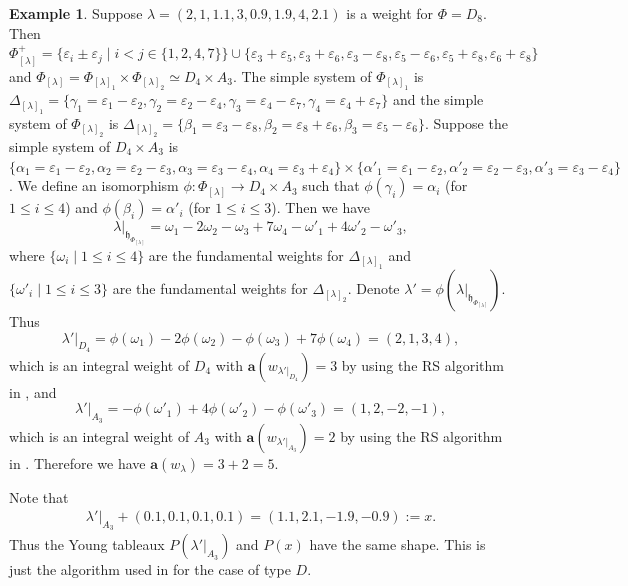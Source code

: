 \documentclass[reqno,12pt]{amsart}
\numberwithin{equation}{section}
\theoremstyle{plain}
\theoremstyle{definition}
\newtheorem{ex}[Thm]{Example}
\newcommand{\lam}{\lambda}
\newcommand{\ep}{\varepsilon}
\newcommand{\aff}{ \mathbf{a} }
\renewcommand{\leq}{\leqslant}
\newcommand{\ev}{^{\mathrm{ev}}}
\newcommand{\od}{^{\mathrm{odd}}}
\begin{document}
\begin{ex}
    Suppose $\lam=(2,1,1.1,3,0.9,1.9,4,2.1)$ is a weight for $\Phi=D_8$. Then $\Phi^+_{[\lam]}=\{\ep_i\pm \ep_{j}\mid i<j \in \{1,2,4,7\}\}\cup \{\ep_3+\ep_5,\ep_3+\ep_6,\ep_3-\ep_8,\ep_5-\ep_6,\ep_5+\ep_8,\ep_6+\ep_8\}$ and $\Phi_{[\lambda]}=\Phi_{[\lambda]_1}\times \Phi_{[\lambda]_2}\simeq D_4\times A_3$.  The simple system of $\Phi_{[\lambda]_1}$ is $\Delta_{[\lambda]_1}=\{\gamma_1=\ep_1- \ep_{2},\gamma_2=\ep_2- \ep_{4},\gamma_3=\ep_4- \ep_{7},\gamma_4=\ep_4+ \ep_{7}\}$ and the simple system of $\Phi_{[\lambda]_2}$ is $\Delta_{[\lambda]_2}=\{\beta_1=\ep_3-\ep_8,\beta_2=\ep_8+\ep_6,\beta_3=\ep_5-\ep_6\}$. Suppose the simple system of $D_4\times A_3$ is $\{\alpha_1=\ep_1-\ep_2,\alpha_2=\ep_2-\ep_3,\alpha_3=\ep_3-\ep_4,\alpha_4=\ep_3+\ep_4\}\times \{\alpha'_1=\ep_1-\ep_2,\alpha'_2=\ep_2-\ep_3,\alpha'_3=\ep_3-\ep_4\}$. We define an isomorphism
     $\phi: \Phi_{[\lam]}\rightarrow D_4\times A_3$ such that   $\phi(\gamma_i)=\alpha_i$ (for $1\leq i\leq 4$) and $\phi(\beta_i)=\alpha'_i$ (for $1\leq i\leq 3$).
    Then we have 
   $$\lambda|_{\mathfrak{h}_{\Phi_{[\lambda]}}}=\omega_1-2\omega_2-\omega_3+7\omega_4-\omega'_1+4\omega'_2-\omega'_3,$$
    where $\{\omega_i\mid 1\leq i\leq 4\}$ are the fundamental weights for $\Delta_{[\lam]_1}$ and $\{\omega'_i\mid 1\leq i\leq 3\}$ are the fundamental weights for $\Delta_{[\lam]_2}$. 
Denote $\lam'=\phi(\lam|_{\mathfrak{h}_{\Phi_{[\lam]}}})$.  Thus  
  $$\lam'|_{D_4}=\phi(\omega_1)-2\phi(\omega_2)-\phi(\omega_3)+7\phi(\omega_4)=(2,1,3,4),$$
 which is an integral weight of $D_4$ with $\aff(w_{\lam'|_{{D_4}}})=3$ by using the RS algorithm in \cite{BXX}, and $$\lam'|_{A_3}=-\phi(\omega'_1)+4\phi(\omega'_2)-\phi(\omega'_3)=(1,2,-2,-1),$$
 which is an integral weight of $A_3$ with $\aff(w_{\lam'|_{{A_3}}})=2$ by using the RS algorithm in \cite{BXX}. 
 Therefore we have $\aff(w_{\lambda})=3+2=5$.

Note that \begin{align*}
    \lam'|_{A_3}+(0.1,0.1,0.1,0.1)=(1.1,2.1,-1.9,-0.9):=x.
\end{align*}
Thus the Young tableaux $P(\lam'|_{A_3})$ and $P(x)$ have the same shape. This is just the algorithm used in \cite{BXX} for the case of type $D$. 

\end{ex}


\end{document}
